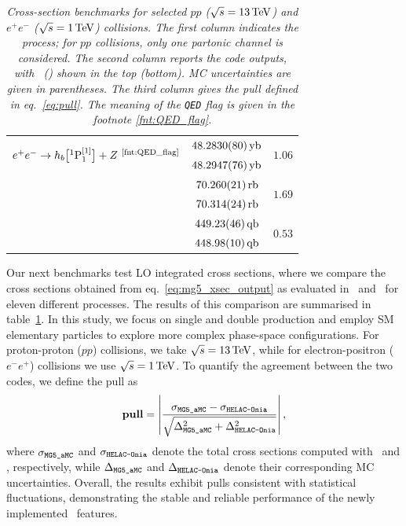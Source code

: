 \begin{table}[t]
\begin{tabular}[t]{lcc}
  \multirow{2}{*}{$e^+ e^- \to h_b\big[{}^1\pwave_1^{[1]}\big] + Z \ \textsuperscript{\ref{fnt:QED_flag}}$} & $48.2830(80)\,{\rm yb}$ & \multirow{2}{*}{$1.06$} \\
 & $48.2947(76)\,{\rm yb}$ & \\
 \hdashline
  \multirow{2}{*}{$e^+ e^- \to h_b\big[{}^1\pwave_1^{[1]}\big] + ZH \ \textsuperscript{\ref{fnt:QED_flag}}$} & $70.260(21)\,{\rm rb}$ & \multirow{2}{*}{$1.69$} \\
 & $70.314(24)\,{\rm rb}$ & \\ \hdashline
  \multirow{2}{*}{$e^+ e^- \to h_b\big[{}^1\pwave_1^{[1]}\big] + ZHH \ \textsuperscript{\ref{fnt:QED_flag}}$} & $449.23(46)\,{\rm qb}$ & \multirow{2}{*}{$0.53$} \\
 & $448.98(10)\,{\rm qb}$ & \\
\bottomrule
\end{tabular}
\caption{\it\small Cross-section benchmarks for selected $pp$ ($\sqrt{s}=13\,{\rm TeV}$) and $e^+ e^-$ ($\sqrt{s}=1\,{\rm TeV}$) collisions. The first column indicates the process; for $pp$ collisions, only one partonic channel is considered. The second column reports the code outputs, with {\tt \mgshort}~({\tt \helaconia}) shown in the top (bottom). MC uncertainties are given in parentheses. The third column gives the pull defined in eq.~\eqref{eq:pull}.
The meaning of the {\tt QED} flag is given in the footnote \ref{fnt:QED_flag}.}
\label{tab:xsec_check}
\end{table}

Our next benchmarks test LO integrated cross sections, where we compare the cross sections obtained from eq.~\eqref{eq:mg5_xsec_output} as evaluated in \mgshort\ and \helaconia\ for eleven different processes. The results of this comparison are summarised in table~\ref{tab:xsec_check}.
In this study, we focus on single and double {\pwavetxt} production and employ SM elementary particles to explore more complex phase-space configurations. For proton-proton ($pp$) collisions, we take $\sqrt s = 13\,{\rm TeV}$, while for electron-positron ($e^-e^+$) collisions we use $\sqrt s = 1\,{\rm TeV}$.
To quantify the agreement between the two codes, we define the pull as
\begin{equation}
    \textbf{pull}=\left|\dfrac{\sigma_{\texttt{MG5\_aMC}}-\sigma_{\texttt{HELAC-Onia}}}{\sqrt{\Delta_{\texttt{MG5\_aMC}}^2+\Delta_{\texttt{HELAC-Onia}}^2}}\right|,
\label{eq:pull}
\end{equation}
where $\sigma_{\texttt{MG5\_aMC}}$ and $\sigma_{\texttt{HELAC-Onia}}$ denote the total cross sections computed with \mgshort\ and \helaconia, respectively, while $\Delta_{\texttt{MG5\_aMC}}$ and $\Delta_{\texttt{HELAC-Onia}}$ denote their corresponding MC uncertainties.
Overall, the results exhibit pulls consistent with statistical fluctuations, demonstrating the stable and reliable performance of the newly implemented \mgshort\ features.

